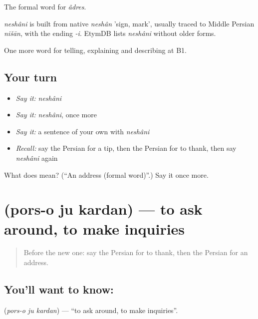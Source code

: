 The formal word for \emph{âdres}.

\begin{cousinweb}
\emph{neshâni} is built from native \emph{neshân} 'sign, mark', usually traced to Middle Persian \emph{nišān}, with the ending \emph{-i}. EtymDB lists \emph{neshâni} without older forms.
\end{cousinweb}

\begin{grammarlens}[title={What you've built}]
One more word for telling, explaining and describing at B1.
\end{grammarlens}

\subsection*{Your turn}
\begin{itemize}
\raggedright
  \item \emph{Say it:} \emph{neshâni}
  \item \emph{Say it:} \emph{neshâni}, once more
  \item \emph{Say it:} a sentence of your own with \emph{neshâni}
  \item \emph{Recall:} say the Persian for a tip, then the Persian for to thank, then say \emph{neshâni} again
\end{itemize}

\begin{tcolorbox}[breakable,colback=teal!4,colframe=teal!35!black,title={Before you move on}]
What does  mean? (\textquotedblleft{}An address (formal word)\textquotedblright{}.) Say it once more.
\end{tcolorbox}
\section[\texorpdfstring{\fa{پرس} \fa{و} \fa{جو} \fa{کردن} (pors-o ju kardan)}{پرس و جو کردن (pors-o ju kardan)}]{    (pors-o ju kardan) — to ask around, to make inquiries}

\label{lesson:FA-C444-pors-o-ju-kardan}



\begin{quote}
Before the new one: say the Persian for to thank, then the Persian for an address.
\end{quote}

\subsection*{You'll want to know:    }
\textbf{   } (\emph{pors-o ju kardan}) — \textquotedblleft{}to ask around, to make inquiries\textquotedblright{}.

